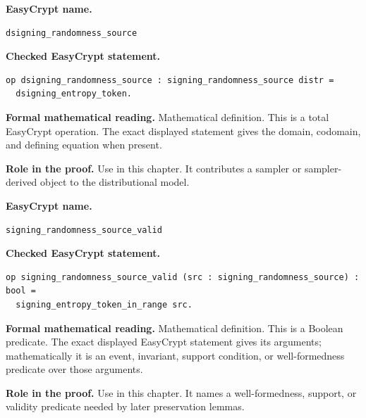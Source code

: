 \begin{formaldefinition}
\noindent\textbf{EasyCrypt name.}
\begin{lstlisting}[language=EasyCrypt,basicstyle=\ttfamily\scriptsize]
dsigning_randomness_source
\end{lstlisting}
\noindent\textbf{Checked EasyCrypt statement.}
\begin{lstlisting}[language=EasyCrypt,basicstyle=\ttfamily\scriptsize]
op dsigning_randomness_source : signing_randomness_source distr =
  dsigning_entropy_token.
\end{lstlisting}
\noindent\textbf{Formal mathematical reading.}
Mathematical definition. This is a total EasyCrypt operation.  The exact displayed statement gives the domain, codomain, and defining equation when present.

\noindent\textbf{Role in the proof.}
Use in this chapter. It contributes a sampler or sampler-derived object to the distributional model.

\end{formaldefinition}

\begin{formaldefinition}
\noindent\textbf{EasyCrypt name.}
\begin{lstlisting}[language=EasyCrypt,basicstyle=\ttfamily\scriptsize]
signing_randomness_source_valid
\end{lstlisting}
\noindent\textbf{Checked EasyCrypt statement.}
\begin{lstlisting}[language=EasyCrypt,basicstyle=\ttfamily\scriptsize]
op signing_randomness_source_valid (src : signing_randomness_source) : bool =
  signing_entropy_token_in_range src.
\end{lstlisting}
\noindent\textbf{Formal mathematical reading.}
Mathematical definition. This is a Boolean predicate.  The exact displayed EasyCrypt statement gives its arguments; mathematically it is an event, invariant, support condition, or well-formedness predicate over those arguments.

\noindent\textbf{Role in the proof.}
Use in this chapter. It names a well-formedness, support, or validity predicate needed by later preservation lemmas.

\end{formaldefinition}

